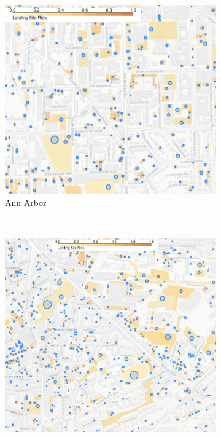 \begin{figure}[!t]
 \centering
 \begin{minipage}[b]{0.50\textwidth}
   \begin{subfigure}[b]{\linewidth}
    \centering\includegraphics[clip, trim=0.0cm 0.0cm 0.0cm 0.0cm, width=\linewidth]{chapter_5_mapping/imgs/annarbor_all_ls_risk.png}
     \caption{Ann Arbor}\label{fig:ch5_aa_all_risk}
   \end{subfigure}\\[\baselineskip]
   \begin{subfigure}[b]{\linewidth}
    \centering\includegraphics[clip, trim=0.0cm 0.0cm 0.0cm 0.0cm, width=\linewidth]{chapter_5_mapping/imgs/witten_all_ls_risk.png}

\end{subfigure}
\end{minipage}
\end{figure}
